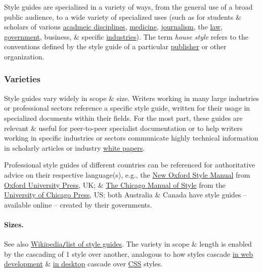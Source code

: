 \documentclass{article}
\begin{document}
Style guides are specialized in a variety of ways, from the general use of a broad public audience, to a wide variety of specialized uses (such as for students \& scholars of various \href{https://en.wikipedia.org/wiki/Academic_discipline}{acadmeic disciplines}, \href{https://en.wikipedia.org/wiki/Medical_publishing}{medicine}, \href{https://en.wikipedia.org/wiki/Journalism}{journalism}, the \href{https://en.wikipedia.org/wiki/Legal_publication}{law}, \href{https://en.wikipedia.org/wiki/Government_Publishing_Office}{government}, business, \& specific \href{https://en.wikipedia.org/wiki/Industry_(economics)}{industries}). The term {\it house style} refers to the conventions defined by the style guide of a particular \href{https://en.wikipedia.org/wiki/Publisher}{publisher} or other organization.

\subsubsection{Varieties}
Style guides vary widely in scope \& size. Writers working in many large industries or professional sectors reference a specific style guide, written for their usage in specialized documents within their fields. For the most part, these guides are relevant \& useful for peer-to-peer specialist documentation or to help writers working in specific industries or sectors communicate highly technical information in scholarly articles or industry \href{https://en.wikipedia.org/wiki/White_paper}{white papers}.

Professional style guides of different countries can be referenced for authoritative advice on their respective language(s), e.g., the \href{https://en.wikipedia.org/wiki/New_Oxford_Style_Manual}{New Oxford Style Manual} from \href{https://en.wikipedia.org/wiki/Oxford_University_Press}{Oxford University Press}, UK; \& \href{https://en.wikipedia.org/wiki/The_Chicago_Manual_of_Style}{The Chicago Manual of Style} from the \href{https://en.wikipedia.org/wiki/University_of_Chicago_Press}{University of Chicago Press}, US; both Australia \& Canada have style guides -- available online -- created by their governments.

\paragraph{Sizes.} See also \href{https://en.wikipedia.org/wiki/List_of_style_guides}{Wikipedia{\tt/}list of style guides}. The variety in scope \& length is enabled by the cascading of 1 style over another, analogous to how styles cascade \href{https://en.wikipedia.org/wiki/Style_sheet_(web_development)}{in web development} \& \href{https://en.wikipedia.org/wiki/Style_sheet_(desktop_publishing)}{in desktop} cascade over \href{https://en.wikipedia.org/wiki/CSS}{CSS} styles.
\end{document}
